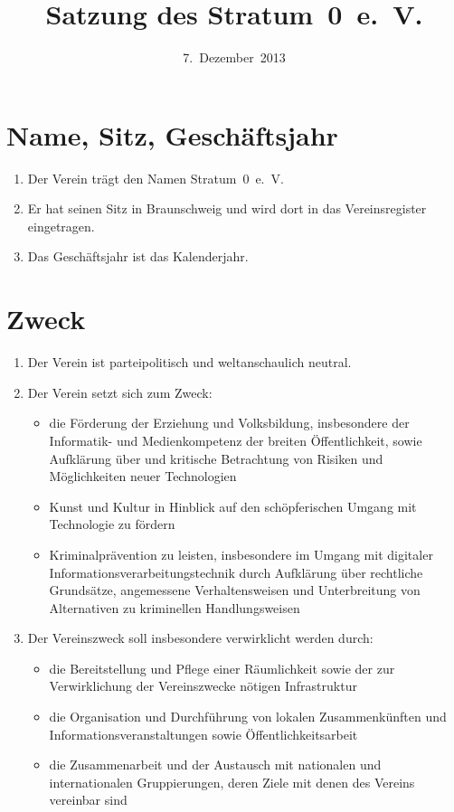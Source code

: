 \documentclass[a4paper,12pt]{scrartcl}
\title{Satzung des Stratum~0~e.~V.}
\date{7.~Dezember~2013}
\begin{document}
\maketitle

\section{Name, Sitz, Geschäftsjahr}
\begin{enumerate}
  \item Der Verein trägt den Namen Stratum~0~e.~V.
  \item Er hat seinen Sitz in Braunschweig und wird dort in das Vereinsregister
    eingetragen.
  \item Das Geschäftsjahr ist das Kalenderjahr.
\end{enumerate}

\section{Zweck}
\begin{enumerate}
  \item Der Verein ist parteipolitisch und weltanschaulich neutral.
  \item Der Verein setzt sich zum Zweck:
    \begin{itemize}
      \item
         die Förderung der Erziehung und Volksbildung, insbesondere der
         Informatik- und Medienkompetenz der breiten Öffentlichkeit, sowie
         Aufklärung über und kritische Betrachtung von Risiken und
         Möglichkeiten neuer Technologien
      \item Kunst und Kultur in Hinblick auf den schöpferischen Umgang mit
        Technologie zu fördern
      \item Kriminalprävention zu leisten, insbesondere im Umgang mit digitaler
        Informationsverarbeitungstechnik durch Aufklärung über rechtliche
        Grundsätze, angemessene Verhaltensweisen und Unterbreitung von
        Alternativen zu kriminellen Handlungsweisen
    \end{itemize}
  \item Der Vereinszweck soll insbesondere verwirklicht werden durch:
    \begin{itemize}
      \item die Bereitstellung und Pflege einer Räumlichkeit sowie der zur
        Verwirklichung der Vereinszwecke nötigen Infrastruktur
      \item die Organisation und Durchführung von lokalen Zusammenkünften und
        Informationsveranstaltungen sowie Öffentlichkeitsarbeit
      \item die Zusammenarbeit und der Austausch mit nationalen und
        internationalen Gruppierungen, deren Ziele mit denen des Vereins
        vereinbar sind
    \end{itemize}
\end{enumerate}
\end{document}
